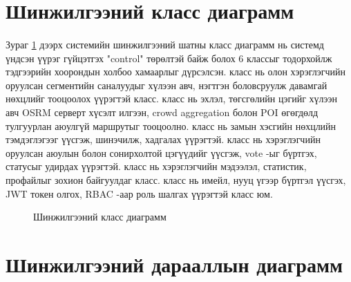 \section{Шинжилгээний класс диаграмм}
\paragraph{} Зураг \ref{fig:sh-class} дээрх системийн шинжилгээний шатны класс диаграмм нь системд үндсэн үүрэг гүйцэтгэх "control" төрөлтэй байж болох 6 классыг тодорхойлж тэдгээрийн хоорондын холбоо хамаарлыг дүрсэлсэн.  класс нь олон хэрэглэгчийн оруулсан сегментийн саналуудыг хүлээн авч, нэгтгэн боловсруулж давамгай нөхцлийг тооцоолох үүрэгтэй класс.  класс нь эхлэл, төгсгөлийн цэгийг хүлээн авч OSRM серверт хүсэлт илгээн, crowd aggregation болон POI өгөгдөлд тулгуурлан аюулгүй маршрутыг тооцоолно.  класс нь замын хэсгийн нөхцлийн тэмдэглэгээг үүсгэж, шинэчилж, хадгалах үүрэгтэй.  класс нь хэрэглэгчийн оруулсан аюулын болон сонирхолтой цэгүүдийг үүсгэж, vote -ыг бүртгэх, статусыг удирдах үүрэгтэй.  класс нь хэрэглэгчийн мэдээлэл, статистик, профайлыг зохион байгуулдаг класс.  класс нь имейл, нууц үгээр бүртгэл үүсгэх, JWT токен олгох, RBAC -аар роль шалгах үүрэгтэй класс юм.
\begin{figure}[H]
    \centering
    \caption{Шинжилгээний класс диаграмм}
    \label{fig:sh-class}
\end{figure}

\section{Шинжилгээний дарааллын диаграмм}
